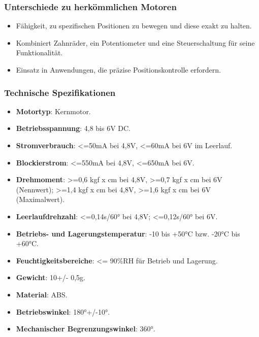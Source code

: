 \documentclass{vorlage-design-main}
\begin{document}
\hypertarget{unterschiede-zu-herkuxf6mmlichen-motoren}{%
\subsubsection{Unterschiede zu herkömmlichen
Motoren}\label{unterschiede-zu-herkoemmlichen-motoren}}

\begin{itemize}

\item
  Fähigkeit, zu spezifischen Positionen zu bewegen und diese exakt zu
  halten.
\item
  Kombiniert Zahnräder, ein Potentiometer und eine Steuerschaltung für
  seine Funktionalität.
\item
  Einsatz in Anwendungen, die präzise Positionskontrolle erfordern.
\end{itemize}

\hypertarget{technische-spezifikationen-1}{%
\subsubsection{Technische
Spezifikationen}\label{technische-spezifikationen-1}}

\begin{itemize}

\item
  \textbf{Motortyp}: Kernmotor.
\item
  \textbf{Betriebsspannung}: 4,8 bis 6V DC.
\item
  \textbf{Stromverbrauch}: \textless=50mA bei 4,8V, \textless=60mA bei
  6V im Leerlauf.
\item
  \textbf{Blockierstrom}: \textless=550mA bei 4,8V, \textless=650mA bei
  6V.
\item
  \textbf{Drehmoment}: \textgreater=0,6 kgf x cm bei 4,8V,
  \textgreater=0,7 kgf x cm bei 6V (Nennwert); \textgreater=1,4 kgf x cm
  bei 4,8V, \textgreater=1,6 kgf x cm bei 6V (Maximalwert).
\item
  \textbf{Leerlaufdrehzahl}: \textless=0,14s/60° bei 4,8V;
  \textless=0,12s/60° bei 6V.
\item
  \textbf{Betriebs- und Lagerungstemperatur}: -10 bis +50°C bzw. -20°C
  bis +60°C.
\item
  \textbf{Feuchtigkeitsbereiche}: \textless= 90\%RH für Betrieb und
  Lagerung.
\item
  \textbf{Gewicht}: 10+/- 0,5g.
\item
  \textbf{Material}: ABS.
\item
  \textbf{Betriebswinkel}: 180°+/-10°.
\item
  \textbf{Mechanischer Begrenzungswinkel}: 360°.
\end{itemize}
\end{document}
